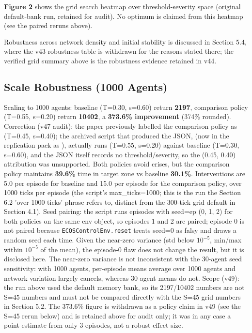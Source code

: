 \documentclass[11pt]{article}
\begin{document}
\textbf{Figure 2} shows the grid search heatmap over threshold-severity space (original default-bank run, retained for audit). No optimum is claimed from this heatmap (see the paired reruns above).

Robustness across network density and initial stability is discussed in Section 5.4, where the v43 robustness table is withdrawn for the reasons stated there; the verified grid summary above is the robustness evidence retained in v44.

\subsection{Scale Robustness (1000 Agents)}
Scaling to 1000 agents: baseline (T=0.30, s=0.60) return \textbf{2197}, comparison policy (T=0.55, s=0.20) return \textbf{10402}, a \textbf{373.6\% improvement} (374\% rounded). Correction (v47 audit): the paper previously labelled the comparison policy as (T=0.45, s=0.40); the archived script that produced the JSON,  (now in the replication pack as ), actually runs (T=0.55, s=0.20) against baseline (T=0.30, s=0.60), and the JSON itself records no threshold/severity, so the (0.45, 0.40) attribution was unsupported. Both policies avoid crises, but the comparison policy maintains \textbf{39.6\%} time in target zone vs baseline \textbf{30.1\%}. Interventions are 5.0 per episode for baseline and 15.0 per episode for the comparison policy, over 1000 ticks per episode (the script's max\_ticks=1000; this is the run the Section 6.2 'over 1000 ticks' phrase refers to, distinct from the 300-tick grid default in Section 4.1). Seed pairing: the script runs episodes with seed=ep (0, 1, 2) for both policies on the same env object, so episodes 1 and 2 are paired; episode 0 is not paired because \texttt{ECOSControlEnv.reset} treats seed=0 as falsy and draws a random seed each time. Given the near-zero variance (std below $10^{-5}$, min/max within $10^{-5}$ of the mean), the episode-0 flaw does not change the result, but it is disclosed here. The near-zero variance is not inconsistent with the 30-agent seed sensitivity: with 1000 agents, per-episode means average over 1000 agents and network variation largely cancels, whereas 30-agent means do not. Scope (v49): the run above used the default memory bank, so its 2197/10402 numbers are not S=45 numbers and must not be compared directly with the S=45 grid numbers in Section 5.2. The 373.6\% figure is withdrawn as a policy claim in v49 (see the S=45 rerun below) and is retained above for audit only; it was in any case a point estimate from only 3 episodes, not a robust effect size.
\end{document}
